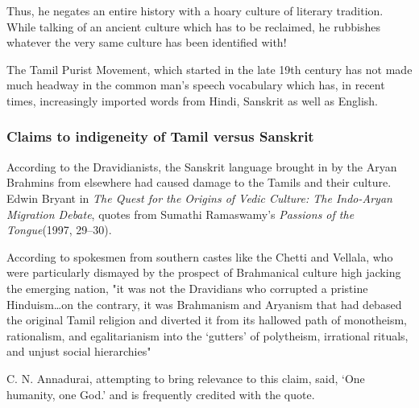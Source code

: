 Thus, he negates an entire history with a hoary culture of literary tradition. While talking of an ancient culture which has to be reclaimed, he rubbishes whatever the very same culture has been identified with!

The Tamil Purist Movement, which started in the late 19th century has not made much headway in the common man’s speech vocabulary which has, in recent times, increasingly imported words from Hindi, Sanskrit as well as English.


\subsubsection*{Claims to indigeneity of Tamil versus Sanskrit}

\vskip -8pt

According to the Dravidianists, the Sanskrit language brought in by the Aryan Brahmins from elsewhere had caused damage to the Tamils and their culture. Edwin Bryant in \textit{The Quest for the Origins of Vedic Culture: The Indo-Aryan Migration Debate}, quotes from Sumathi Ramaswamy’s \textit{Passions of the Tongue}(1997, 29–30).

\begin{myquote}
According to spokesmen from southern castes like the Chetti and Vellala, who were particularly dismayed by the prospect of Brahmanical culture high jacking the emerging nation, "it was not the Dravidians who corrupted a pristine Hinduism…on the contrary, it was Brahmanism and Aryanism that had debased the original Tamil religion and diverted it from its hallowed path of monotheism, rationalism, and egalitarianism into the ‘gutters’ of polytheism, irrational rituals, and unjust social hierarchies"
\end{myquote}

C. N. Annadurai, attempting to bring relevance to this claim, said, ‘One humanity, one God.’ and is frequently credited with the quote.

